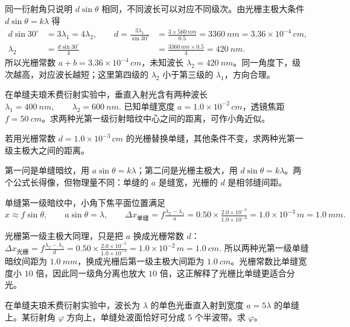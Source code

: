 \documentclass[lang=cn,11pt]{elegantbook}
\begin{document}
\begin{solution}
同一衍射角只说明 \(d\sin\theta\) 相同，不同波长可以对应不同级次。由光栅主极大条件 \(d\sin\theta=k\lambda\) 得
\[
\begin{aligned}
d\sin30^\circ&=3\lambda_1=4\lambda_2,\qquad
d=\frac{3\lambda_1}{\sin30^\circ}
&=\frac{3\times560\,\si{nm}}{0.5}
=\SI{3360}{nm}=3.36\times10^{-4}\,\si{cm},\\
\lambda_2&=\frac{d\sin30^\circ}{4}
&=\frac{3360\,\si{nm}\times0.5}{4}
=\SI{420}{nm}.
\end{aligned}
\]
所以光栅常数 \(a+b=3.36\times10^{-4}\,\si{cm}\)，未知波长 \(\lambda_2=\SI{420}{nm}\)。同一角度下，级次越高，对应波长越短；这里第四级的 \(\lambda_2\) 小于第三级的 \(\lambda_1\)，方向合理。
\end{solution}

\begin{exercise}[2015-2016期末：单缝暗纹与光栅主极大怎样分开算]
在单缝夫琅禾费衍射实验中，垂直入射光含有两种波长
 \(\lambda_1=\SI{400}{nm},\qquad \lambda_2=\SI{600}{nm}.\) 
已知单缝宽度 \(a=1.0\times10^{-2}\,\si{cm}\)，透镜焦距 \(f=\SI{50}{cm}\)。求两种光第一级衍射暗纹中心之间的距离，可作小角近似。

若用光栅常数 \(d=1.0\times10^{-3}\,\si{cm}\) 的光栅替换单缝，其他条件不变，求两种光第一级主极大之间的距离。
\end{exercise}

\begin{solution}
第一问是单缝暗纹，用 \(a\sin\theta=k\lambda\)；第二问是光栅主极大，用 \(d\sin\theta=k\lambda\)。两个公式长得像，但物理量不同：单缝的 \(a\) 是缝宽，光栅的 \(d\) 是相邻缝间距。

单缝第一级暗纹中，小角下焦平面位置满足
 \(x\approx f\sin\theta,\qquad a\sin\theta=\lambda,\qquad \Delta x_{\text{单缝}} =f\frac{\lambda_2-\lambda_1}{a} =0.50\times\frac{2.0\times10^{-7}}{1.0\times10^{-4}} =1.0\times10^{-3}\,\si{m} =\SI{1.0}{mm}.\) 

光栅第一级主极大同理，只是把 \(a\) 换成光栅常数 \(d\)：
 \(\Delta x_{\text{光栅}} =f\frac{\lambda_2-\lambda_1}{d} =0.50\times\frac{2.0\times10^{-7}}{1.0\times10^{-5}} =1.0\times10^{-2}\,\si{m} =\SI{1.0}{cm}.\) 
所以两种光第一级单缝暗纹间距为 \(\SI{1.0}{mm}\)，换成光栅后第一级主极大间距为 \(\SI{1.0}{cm}\)。光栅常数比单缝宽度小 \(10\) 倍，因此同一级角分离也放大 \(10\) 倍，这正解释了光栅比单缝更适合分光。
\end{solution}

\begin{exercise}
在单缝夫琅禾费衍射实验中，波长为 \(\lambda\) 的单色光垂直入射到宽度 \(a=5\lambda\) 的单缝上。某衍射角 \(\varphi\) 方向上，单缝处波面恰好可分成 \(5\) 个半波带。求 \(\varphi\)。
\end{exercise}
\end{document}
